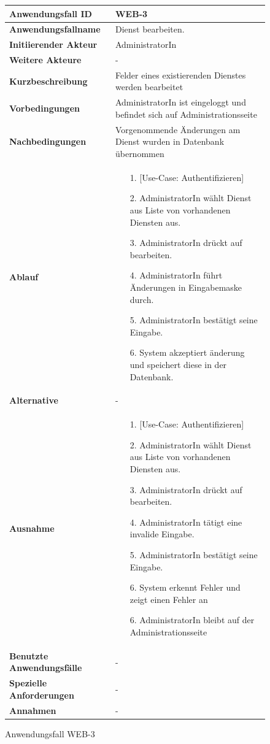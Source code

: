 \begin{figure}[h]
	\centering
	\begin{tabularx}{\textwidth}{ X | X }
		\textbf{Anwendungsfall ID} & WEB-3 \\ \hline
		\textbf{Anwendungsfallname} & Dienst bearbeiten. \\ \hline
		\textbf{Initiierender Akteur} & AdministratorIn \\ \hline
		\textbf{Weitere Akteure} & - \\ \hline
		\textbf{Kurzbeschreibung} & Felder eines existierenden Dienstes werden bearbeitet \\ \hline
		\textbf{Vorbedingungen} & AdministratorIn ist eingeloggt und befindet sich auf Administrationsseite \\ \hline
		\textbf{Nachbedingungen} & Vorgenommende Änderungen am Dienst wurden in Datenbank übernommen \\ \hline
		\textbf{Ablauf} &
		\begin{enumerate}
			\item [1.] [Use-Case: Authentifizieren]
			\item [2.] AdministratorIn wählt Dienst aus Liste von vorhandenen Diensten aus.
			\item [3.] AdministratorIn drückt auf bearbeiten.
			\item [4.] AdministratorIn führt Änderungen in Eingabemaske durch.
			\item [5.] AdministratorIn bestätigt seine Eingabe.
			\item [6.] System akzeptiert änderung und speichert diese in der Datenbank.
		\end{enumerate} \\ \hline
		\textbf{Alternative} & - \\ \hline
		\textbf{Ausnahme} &
		\begin{enumerate}
			\item [1.] [Use-Case: Authentifizieren]
			\item [2.] AdministratorIn wählt Dienst aus Liste von vorhandenen Diensten aus.
			\item [3.] AdministratorIn drückt auf bearbeiten.
			\item [4.] AdministratorIn tätigt eine invalide Eingabe.
			\item [5.] AdministratorIn bestätigt seine Eingabe.
			\item [6.] System erkennt Fehler und zeigt einen Fehler an
			\item [6.] AdministratorIn bleibt auf der Administrationsseite
		\end{enumerate}  \\ \hline
		\textbf{Benutzte Anwendungsfälle} & - \\ \hline
		\textbf{Spezielle Anforderungen} & - \\ \hline
		\textbf{Annahmen} & -
	\end{tabularx}
	\caption{Anwendungsfall WEB-3}
	\label{fig:anwendungsfall-server-tabelle-web-3}
\end{figure}

